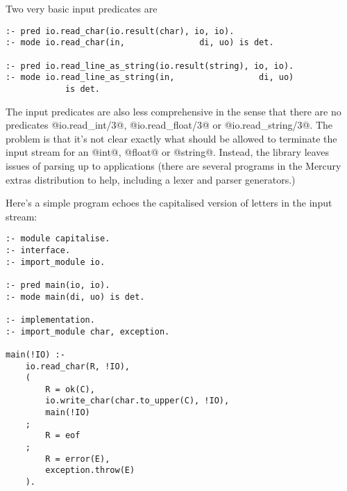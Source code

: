 Two very basic input predicates are
\begin{verbatim}
:- pred io.read_char(io.result(char), io, io).
:- mode io.read_char(in,               di, uo) is det.

:- pred io.read_line_as_string(io.result(string), io, io).
:- mode io.read_line_as_string(in,                 di, uo)
            is det.
\end{verbatim}

The input predicates are also less comprehensive in the
sense that there are no predicates @io.read_int/3@,
@io.read_float/3@ or @io.read_string/3@.  The problem is
that it's not clear exactly what should be allowed to
terminate the input stream for an @int@, @float@ or @string@.
Instead, the library leaves issues of parsing up to
applications (there are several programs in the Mercury
extras distribution to help, including a lexer and parser
generators.)

Here's a simple program echoes the capitalised version of
letters in the input stream:
\begin{verbatim}
:- module capitalise.
:- interface.
:- import_module io.

:- pred main(io, io).
:- mode main(di, uo) is det.

:- implementation.
:- import_module char, exception.

main(!IO) :-
    io.read_char(R, !IO),
    (
        R = ok(C),
        io.write_char(char.to_upper(C), !IO),
        main(!IO)
    ;
        R = eof
    ;
        R = error(E),
        exception.throw(E)
    ).
\end{verbatim}



